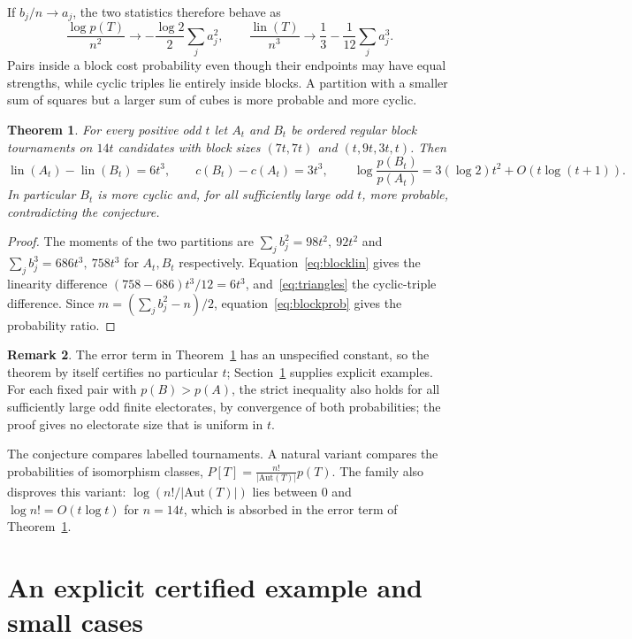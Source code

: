 \documentclass[11pt,a4paper]{article}
\newtheorem{theorem}{Theorem}[section]
\theoremstyle{definition}
\newtheorem{remark}[theorem]{Remark}
\DeclareMathOperator{\lin}{lin}
\begin{document}
If $b_j/n\to a_j$, the two statistics therefore behave as
\[
 \frac{\log p(T)}{n^2}\longrightarrow
 -\frac{\log2}{2}\sum_j a_j^2,\qquad
 \frac{\lin(T)}{n^3}\longrightarrow
 \frac13-\frac1{12}\sum_j a_j^3 .
\]
Pairs inside a block cost probability even though their endpoints may have equal strengths, while cyclic triples lie entirely inside blocks. A partition with a smaller sum of squares but a larger sum of cubes is more probable and more cyclic.

\begin{theorem}\label{thm:headline}
For every positive odd $t$ let $A_t$ and $B_t$ be ordered regular block tournaments on $14t$ candidates with block sizes $(7t,7t)$ and $(t,9t,3t,t)$. Then
\[
 \lin(A_t)-\lin(B_t)=6t^3,\qquad c(B_t)-c(A_t)=3t^3,\qquad
 \log\frac{p(B_t)}{p(A_t)}=3(\log 2)t^2+O(t\log(t+1)).
\]
In particular $B_t$ is more cyclic and, for all sufficiently large odd $t$, more probable, contradicting the conjecture.
\end{theorem}

\begin{proof}
The moments of the two partitions are $\sum_j b_j^2=98t^2,\ 92t^2$ and $\sum_j b_j^3=686t^3,\ 758t^3$ for $A_t,B_t$ respectively. Equation~\eqref{eq:blocklin} gives the linearity difference $(758-686)t^3/12=6t^3$, and~\eqref{eq:triangles} the cyclic-triple difference. Since $m=(\sum_j b_j^2-n)/2$, equation~\eqref{eq:blockprob} gives the probability ratio.
\end{proof}

\begin{remark}\label{rem:headline-scope}
The error term in Theorem~\ref{thm:headline} has an unspecified constant, so the theorem by itself certifies no particular $t$; Section~\ref{sec:finite} supplies explicit examples. For each fixed pair with $p(B)>p(A)$, the strict inequality also holds for all sufficiently large odd finite electorates, by convergence of both probabilities; the proof gives no electorate size that is uniform in $t$.
\end{remark}

The conjecture compares labelled tournaments. A natural variant compares the probabilities of isomorphism classes, $P[T]=\frac{n!}{|\mathrm{Aut}(T)|}p(T)$. The family also disproves this variant: $\log(n!/|\mathrm{Aut}(T)|)$ lies between $0$ and $\log n!=O(t\log t)$ for $n=14t$, which is absorbed in the error term of Theorem~\ref{thm:headline}.

\section{An explicit certified example and small cases}\label{sec:finite}
\end{document}
